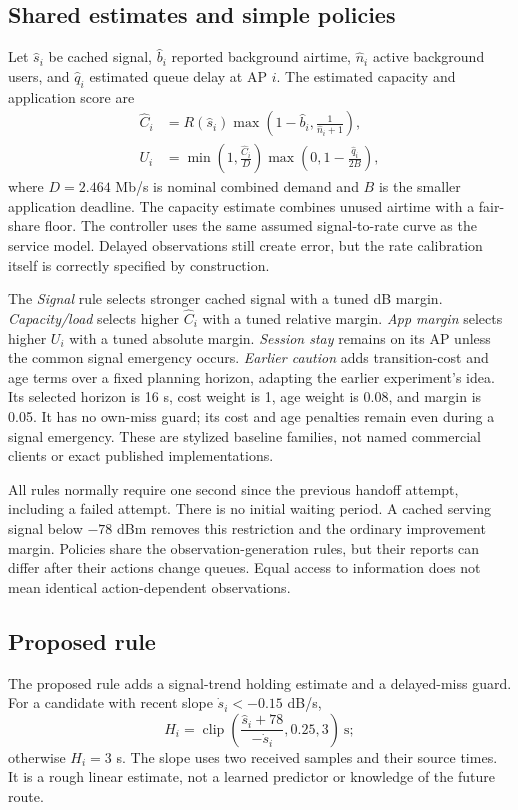 \documentclass[11pt,a4paper]{article}
\begin{document}
\subsection{Shared estimates and simple policies}
Let $\hat s_i$ be cached signal, $\hat b_i$ reported background airtime, $\hat n_i$ active background users, and $\hat q_i$ estimated queue delay at AP $i$. The estimated capacity and application score are
\begin{align}
 \hat C_i &=R(\hat s_i)\max\left(1-\hat b_i,\frac{1}{\hat n_i+1}\right),\label{eq:capacity}\\
 U_i &=\min\left(1,\frac{\hat C_i}{D}\right)\max\left(0,1-\frac{\hat q_i}{2B}\right),\label{eq:utility}
\end{align}
where $D=2.464$ Mb/s is nominal combined demand and $B$ is the smaller application deadline. The capacity estimate combines unused airtime with a fair-share floor. The controller uses the same assumed signal-to-rate curve as the service model. Delayed observations still create error, but the rate calibration itself is correctly specified by construction.

The \emph{Signal} rule selects stronger cached signal with a tuned dB margin. \emph{Capacity/load} selects higher $\hat C_i$ with a tuned relative margin. \emph{App margin} selects higher $U_i$ with a tuned absolute margin. \emph{Session stay} remains on its AP unless the common signal emergency occurs. \emph{Earlier caution} adds transition-cost and age terms over a fixed planning horizon, adapting the earlier experiment's idea. Its selected horizon is 16 s, cost weight is 1, age weight is 0.08, and margin is 0.05. It has no own-miss guard; its cost and age penalties remain even during a signal emergency. These are stylized baseline families, not named commercial clients or exact published implementations.

All rules normally require one second since the previous handoff attempt, including a failed attempt. There is no initial waiting period. A cached serving signal below $-78$ dBm removes this restriction and the ordinary improvement margin. Policies share the observation-generation rules, but their reports can differ after their actions change queues. Equal access to information does not mean identical action-dependent observations.

\subsection{Proposed rule}
The proposed rule adds a signal-trend holding estimate and a delayed-miss guard. For a candidate with recent slope $\dot s_i<-0.15$ dB/s,
\begin{equation}
 H_i=\operatorname{clip}\left(\frac{\hat s_i+78}{-\dot s_i},0.25,3\right)\ \text{s};
\end{equation}
otherwise $H_i=3$ s. The slope uses two received samples and their source times. It is a rough linear estimate, not a learned predictor or knowledge of the future route.
\end{document}
